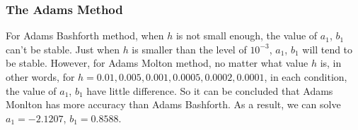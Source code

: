 \documentclass[a4paper]{article}
\begin{document}
	\begin{table}[H]
		\centering
		\caption{Using Runge-Kutta Method to Determine t When y is infinity}
		\label{tab:rk_inf}
	\end{table}
	
	
	\subsubsection{The Adams Method}
	
	For Adams Bashforth method, when $h$ is not small enough, the value of $a_1$, $b_1$ can’t be stable. Just when $h$ is smaller than the level of $10^{-3}$, $a_1$, $b_1$ will tend to be stable. However, for Adams Molton method, no matter what value $h$ is, in other words, for $h=0.01,0.005,0.001,0.0005,0.0002,0.0001$, in each condition, the value of $a_1$, $b_1$ have little difference. So it can be concluded that Adams Monlton has more accuracy than Adams Bashforth. As a result, we can solve $a_1=-2.1207$, $b_1=0.8588$.
	
\end{document}
